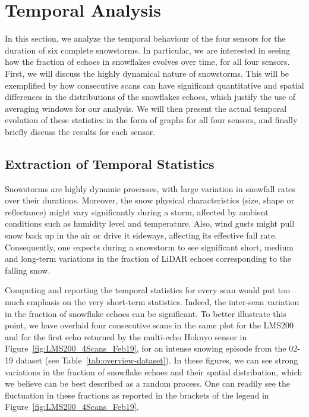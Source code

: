 \section{Temporal Analysis}
\label{sec:chap_lidar_temporal}

In this section, we analyze the temporal behaviour of the four sensors for the duration of six complete snowstorms. In particular, we are interested in seeing how the fraction of echoes in snowflakes evolves over time, for all four sensors. First, we will discuss the highly dynamical nature of snowstorms. This will be exemplified by how consecutive scans can have significant quantitative and spatial differences in the distributions of the snowflakes echoes, which justify the use of averaging windows for our analysis. We will then present the actual temporal evolution of these statistics in the form of graphs for all four sensors, and finally briefly discuss the results for each sensor.

\subsection{Extraction of Temporal Statistics}

Snowstorms are highly dynamic processes, with large variation in snowfall rates over their durations. Moreover, the snow physical characteristics (size, shape or reflectance) might vary significantly during a storm, affected by ambient conditions such as humidity level and temperature. Also, wind gusts might pull snow back up in the air or drive it sideways, affecting its effective fall rate. Consequently, one expects during a snowstorm to see significant short, medium and long-term variations in the fraction of LiDAR echoes corresponding to the falling snow.

Computing and reporting the temporal statistics for every scan would put too much emphasis on the very short-term statistics. Indeed, the inter-scan variation in the fraction of snowflake echoes can be significant. To better illustrate this point, we have overlaid four consecutive scans in the same plot for the LMS200 and for the first echo returned by the multi-echo Hokuyo sensor in Figure~\ref{fig:LMS200_4Scans_Feb19}, for an intense snowing episode from the 02-19 dataset (see Table~\ref{tab:overview-dataset}). In these figures, we can see strong variations in the fraction of snowflake echoes and their spatial distribution, which we believe can be best described as a random process. One can readily see the fluctuation in these fractions as reported in the brackets of the legend in Figure~\ref{fig:LMS200_4Scans_Feb19}.

